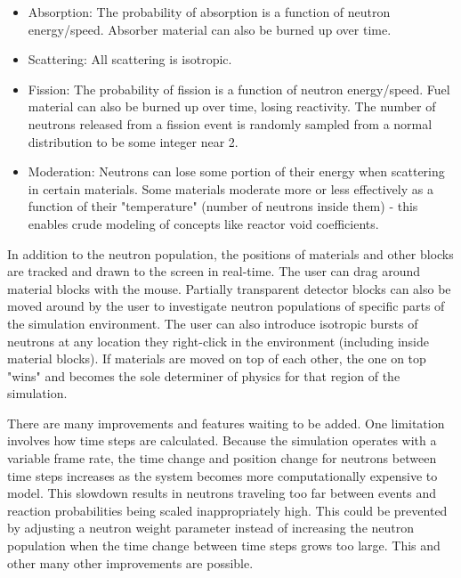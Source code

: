 \documentclass{anstrans}
\begin{document}
\begin{itemize}

    \item Absorption: The probability of absorption is a function of neutron
        energy/speed.  Absorber material can also be burned up over time.

    \item Scattering: All scattering is isotropic.

    \item Fission: The probability of fission is a function of neutron
        energy/speed.  Fuel material can also be burned up over time, losing
        reactivity.  The number of neutrons released from a fission event is
        randomly sampled from a normal distribution to be some integer near 2.

    \item Moderation: Neutrons can lose some portion of their energy when
        scattering in certain materials. Some materials moderate more or less
        effectively as a function of their "temperature" (number of neutrons
        inside them) - this enables crude modeling of concepts like reactor
        void coefficients.

\end{itemize}

In addition to the neutron population, the positions of materials and other
blocks are tracked and drawn to the screen in real-time.  The user can drag
around material blocks with the mouse.  Partially transparent detector blocks
can also be moved around by the user to investigate neutron populations of
specific parts of the simulation environment.  The user can also introduce
isotropic bursts of neutrons at any location they right-click in the
environment (including inside material blocks).  If materials are moved on top
of each other, the one on top "wins" and becomes the sole determiner of
physics for that region of the simulation.

There are many improvements and features waiting to be added.  One limitation
involves how time steps are calculated.  Because the simulation operates with
a variable frame rate, the time change and position change for neutrons
between time steps increases as the system becomes more computationally
expensive to model.  This slowdown results in neutrons traveling too far
between events and reaction probabilities being scaled inappropriately high.
This could be prevented by adjusting a neutron weight parameter instead of
increasing the neutron population when the time change between time steps
grows too large.  This and other many other improvements are possible.
\end{document}
